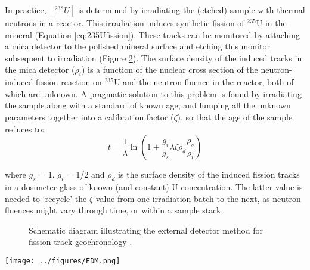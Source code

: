 In practice, $[^{238}U]$ is determined by irradiating the (etched)
sample with thermal neutrons in a reactor. This irradiation induces
synthetic fission of $^{235}$U in the mineral (Equation
\ref{eq:235Ufission}). These tracks can be monitored by attaching a
mica detector to the polished mineral surface and etching this monitor
subsequent to irradiation (Figure \ref{fig:EDM}). The surface density
of the induced tracks in the mica detector ($\rho_i$) is a function of
the nuclear cross section of the neutron-induced fission reaction on
$^{235}$U and the neutron fluence in the reactor, both of which are
unknown. A pragmatic solution to this problem is found by irradiating
the sample along with a standard of known age, and lumping all the
unknown parameters together into a calibration factor ($\zeta$), so
that the age of the sample reduces to:
\begin{equation}
t =
\frac{1}{\lambda}\ln\left(1+\frac{g_i}{g_s}\lambda\zeta\rho_d\frac{\rho_s}{\rho_i}\right)
\label{eq:tzeta}
\end{equation}

where $g_s$ = 1, $g_i$ = 1/2 and $\rho_d$ is the surface density of
the induced fission tracks in a dosimeter glass of known (and
constant) U concentration. The latter value is needed to `recycle' the
$\zeta$ value from one irradiation batch to the next, as neutron
fluences might vary through time, or within a sample stack.\\

\ifpdf
\ifuclnotes
\begin{figure}[!ht]
  \centering
  \def\svgwidth{.8\textwidth}
  
  \caption{Schematic diagram illustrating the external detector method
    for fission track geochronology \citep[modified
      from][]{galbraith2005}.}
  \label{fig:EDM}
\end{figure}
\else %
\begin{figure}[!ht]
\noindent\begin{minipage}[t]{.6\textwidth}
\strut\vspace*{-\baselineskip}\newline
\def\svgwidth{\textwidth}

\end{minipage}
\begin{minipage}[t]{.4\textwidth}
  \label{fig:EDM}
\end{minipage}
\end{figure}
\fi %
\else
\texttt{[image: ../figures/EDM.png]}
\caption{Schematic diagram illustrating the external detector method
  for fission track geochronology \citep[modified
    from][]{galbraith2005}.}
  \label{fig:EDM}
\fi

